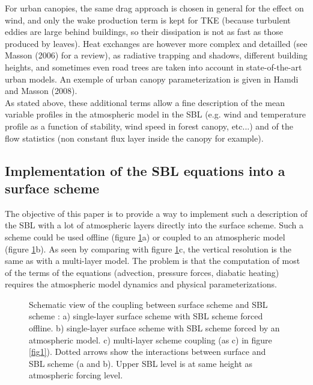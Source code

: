 For urban canopies, the same drag approach is chosen in general for the effect on wind, and only the wake production term is kept for TKE (because turbulent eddies are large behind buildings, so their dissipation is not as fast as those produced by leaves). Heat exchanges are however more complex and detailled (see Masson (2006)\nocite{Masson2006} for a review), as radiative trapping and shadows, different building heights, and sometimes even road trees are taken into account in state-of-the-art urban models. An exemple of urban canopy parameterization is given in Hamdi and Masson (2008)\nocite{Hamdi2008}.\\

As stated above, these additional terms allow a fine description of the mean variable profiles in the atmospheric model in the SBL (e.g. wind and temperature profile as a function of stability, wind speed in forest canopy, etc...) and of the flow statistics (non constant flux layer inside the canopy for example). \\

\subsection{Implementation of the SBL equations into a surface scheme}

The objective of this paper is to provide a way to implement such a description of the SBL with a lot of atmospheric layers directly into the surface scheme. Such a scheme could be used offline (figure \ref{fig2}a) or coupled to an atmospheric model (figure \ref{fig2}b). As seen by comparing with figure \ref{fig2}c, the vertical resolution is the same as with a multi-layer model. The problem is that the computation of most of the terms of the equations (advection, pressure forces, diabatic heating) requires the atmospheric model dynamics and physical parameterizations. \\

\begin{figure}[h]
\hspace*{2.cm}
 \caption{Schematic view of the coupling between surface scheme and SBL scheme : a) single-layer surface scheme with SBL scheme forced offline. b) single-layer surface scheme with SBL scheme forced by an atmospheric model. c) multi-layer scheme coupling (as c) in figure \ref{fig1}). Dotted arrows show the interactions between surface and SBL scheme (a and b). Upper SBL level is at same height as atmospheric forcing level.\label{fig2}}
\end{figure}


